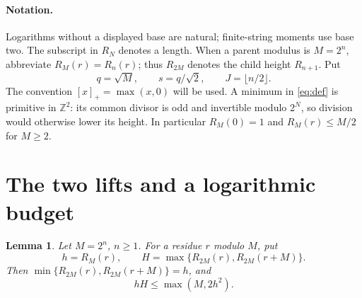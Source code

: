\documentclass[11pt,a4paper]{article}
\numberwithin{equation}{section}
\newtheorem{lemma}[theorem]{Lemma}
\theoremstyle{remark}
\newcommand{\Z}{\mathbb Z}
\begin{document}
\paragraph{Notation.}
Logarithms without a displayed base are natural; finite-string moments use base two. The subscript in $R_N$ denotes
a length. When a parent modulus is $M=2^n$, abbreviate $R_M(r)=R_n(r)$;
thus $R_{2M}$ denotes the child height $R_{n+1}$. Put
\[
 q=\sqrt M,\qquad s=q/\sqrt2,\qquad J=\lfloor n/2\rfloor.
\]
The convention $[x]_+=\max(x,0)$ will be used.
A minimum in \eqref{eq:def} is primitive in $\Z^2$: its common divisor
is odd and invertible modulo $2^N$, so division would otherwise lower
its height. In particular $R_M(0)=1$ and $R_M(r)\le M/2$ for $M\ge2$.

\section{The two lifts and a logarithmic budget}
\begin{lemma}\label{lem:children}
Let $M=2^n$, $n\ge1$. For a residue $r$ modulo $M$, put
\[
 h=R_M(r),\qquad H=\max\{R_{2M}(r),R_{2M}(r+M)\}.
\]
Then $\min\{R_{2M}(r),R_{2M}(r+M)\}=h$, and
\begin{equation}\label{eq:product}
                            hH\le\max(M,2h^2).
\end{equation}
\end{lemma}
\end{document}
